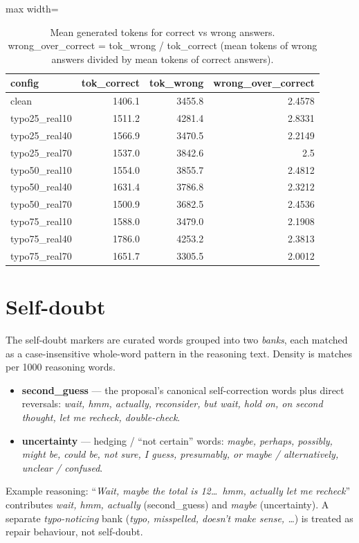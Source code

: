 \documentclass[11pt]{article}
\begin{document}
\begin{table}[H]
\centering
\caption{Mean generated tokens for correct vs wrong answers. wrong\_over\_correct = tok\_wrong / tok\_correct (mean tokens of wrong answers divided by mean tokens of correct answers).}
\small
\begin{adjustbox}{max width=\textwidth}
\begin{tabular}{lrrr}
\toprule
\textbf{config} & \textbf{tok\_correct} & \textbf{tok\_wrong} & \textbf{wrong\_over\_correct} \\
\midrule
clean & 1406.1 & 3455.8 & 2.4578 \\
typo25\_real10 & 1511.2 & 4281.4 & 2.8331 \\
typo25\_real40 & 1566.9 & 3470.5 & 2.2149 \\
typo25\_real70 & 1537.0 & 3842.6 & 2.5 \\
typo50\_real10 & 1554.0 & 3855.7 & 2.4812 \\
typo50\_real40 & 1631.4 & 3786.8 & 2.3212 \\
typo50\_real70 & 1500.9 & 3682.5 & 2.4536 \\
typo75\_real10 & 1588.0 & 3479.0 & 2.1908 \\
typo75\_real40 & 1786.0 & 4253.2 & 2.3813 \\
typo75\_real70 & 1651.7 & 3305.5 & 2.0012 \\
\bottomrule
\end{tabular}
\end{adjustbox}
\end{table}

\section*{Self-doubt}
\noindent The self-doubt markers are curated words grouped into two
\emph{banks}, each matched as a case-insensitive whole-word pattern in the reasoning
text. Density is matches per 1000 reasoning words.
\begin{itemize}\setlength{\itemsep}{1pt}
  \item \textbf{second\_guess} --- the proposal's canonical self-correction words plus
  direct reversals: \emph{wait, hmm, actually, reconsider, but wait, hold on, on second
  thought, let me recheck, double-check}.
  \item \textbf{uncertainty} --- hedging / ``not certain'' words: \emph{maybe, perhaps,
  possibly, might be, could be, not sure, I guess, presumably, or maybe / alternatively,
  unclear / confused}.
\end{itemize}
\noindent Example reasoning: ``\emph{Wait, maybe the total is 12\dots\ hmm, actually let
me recheck}'' contributes \emph{wait, hmm, actually} (second\_guess) and \emph{maybe}
(uncertainty). A separate \emph{typo-noticing} bank (\emph{typo, misspelled, doesn't make
sense, \dots}) is treated as repair behaviour, not self-doubt.
\medskip
\end{document}
